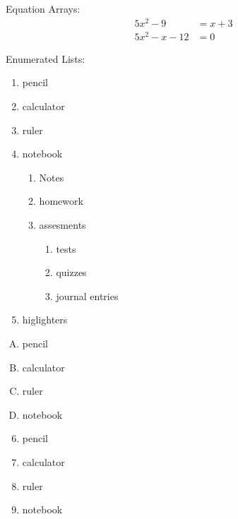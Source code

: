 \documentclass[11pt]{article}
\begin{document}
Equation Arrays: \\

\begin{align}
    5x^2-9    & =x+3 \\
    5x^2-x-12 & = 0
\end{align}

Enumerated Lists: \\
\begin{enumerate}
    \item pencil
    \item calculator
    \item ruler
    \item notebook
          \begin{enumerate}
              \item Notes
              \item homework
              \item assesments
                    \begin{enumerate}
                        \item tests
                        \item quizzes
                        \item journal entries
                    \end{enumerate}
          \end{enumerate}
    \item higlighters
\end{enumerate}

\vspace{1cm}

\begin{enumerate}[A.]
    \item pencil
    \item calculator
    \item ruler
    \item notebook
\end{enumerate}
\vspace{1cm}

\begin{enumerate}\setcounter{enumi}{5}
    \item pencil
    \item calculator
    \item ruler
    \item notebook
\end{enumerate}

\pagebreak
\end{document}
